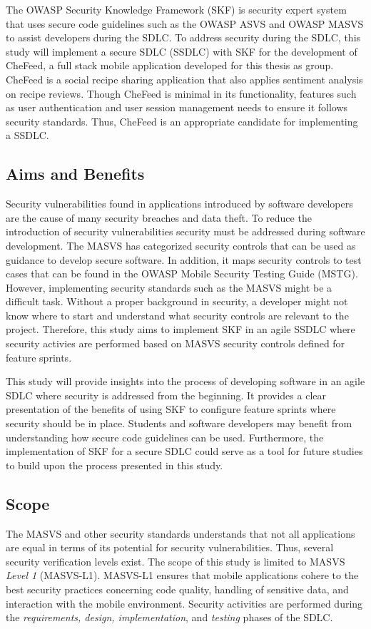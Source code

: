 The OWASP Security Knowledge Framework (SKF) is security expert system that uses secure code guidelines such as the OWASP ASVS and OWASP MASVS to assist developers during the SDLC. To address security during the SDLC, this study will implement a secure SDLC (SSDLC) with SKF for the development of CheFeed, a full stack mobile application developed for this thesis as group. CheFeed is a social recipe sharing application that also applies sentiment analysis on recipe reviews. Though CheFeed is minimal in its functionality, features such as user authentication and user session management needs to ensure it follows security standards. Thus, CheFeed is an appropriate candidate for implementing a SSDLC. 

\subsection{Aims and Benefits}

Security vulnerabilities found in applications introduced by software developers are the cause of many security breaches and data theft. To reduce the introduction of security vulnerabilities security must be addressed during software development. The MASVS has categorized security controls that can be used as guidance to develop secure software. In addition, it maps security controls to test cases that can be found in the OWASP Mobile Security Testing Guide (MSTG). However, implementing security standards such as the MASVS might be a difficult task. Without a proper background in security, a developer might not know where to start and understand what security controls are relevant to the project. Therefore, this study aims to implement SKF in an agile SSDLC where security activies are performed based on MASVS security controls defined for feature sprints.   

This study will provide insights into the process of developing software in an agile SDLC where security is addressed from the beginning. It provides a clear presentation of the benefits of using SKF to configure feature sprints where security should be in place. Students and software developers may benefit from understanding how secure code guidelines can be used. Furthermore, the implementation of SKF for a secure SDLC could serve as a tool for future studies to build upon the process presented in this study.

\subsection{Scope}
The MASVS and other security standards understands that not all applications are equal in terms of its potential for security vulnerabilities. Thus, several security verification levels exist. The scope of this study is limited to MASVS \emph{Level 1} (MASVS-L1). MASVS-L1 ensures that mobile applications cohere to the best security practices concerning code quality, handling of sensitive data, and interaction with the mobile environment. Security activities are performed during the \emph{requirements, design, implementation}, and \emph{testing} phases of the SDLC.

